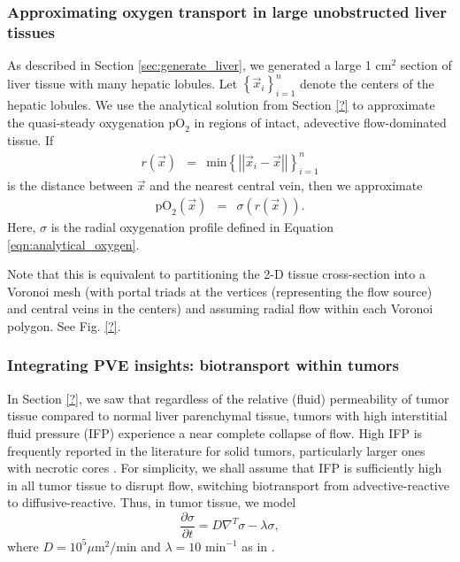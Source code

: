 \documentclass[smallextended,natbib]{svjour3}
\newcommand{\beqa}{\begin{eqnarray}}
\newcommand{\beq}{\begin{equation}}
\newcommand{\eeqa}{\end{eqnarray}}
\newcommand{\eeq}{\end{equation}}
\newcommand{\micron}{\mu\textrm{m}}
\newcommand{\norm}[1]{\left|\left|#1\right|\right|}
\newcommand{\oxy}{\mathrm{pO}_2}
\newcommand{\braces}[1]{\left\{#1\right\}}
\begin{document}
\subsubsection{Approximating oxygen transport in large unobstructed liver tissues}
As described in Section \ref{sec:generate_liver}, we generated a large 1 cm$^2$ 
section of liver tissue with many hepatic lobules. Let 
$\braces{ \vec{x}_i }_{i=1}^n$ denote the centers of the hepatic lobules. 
We use the analytical solution from Section \ref{?} to approximate the 
quasi-steady oxygenation $\oxy$ in regions of intact, 
adevective flow-dominated tissue. If 
\beqa
r(\vec{x}) & = & \mathrm{min}\braces{ \norm{ \vec{x}_i -\vec{x}} }_{i=1}^n 
\eeqa
is the distance between $\vec{x}$ and the nearest central vein, 
then we approximate 
\beqa
\oxy(\vec{x}) & = & \sigma\left( r(\vec{x}) \right). 
\eeqa
Here, $\sigma$ is the radial oxygenation profile 
defined in Equation \ref{eqn:analytical_oxygen}. 

Note that this is equivalent to partitioning the 2-D tissue cross-section 
into a Voronoi mesh (with portal triads at the vertices (representing the 
flow source) and central veins in the centers) and assuming radial flow 
within each Voronoi polygon. See Fig. \ref{?}. 

\subsubsection{Integrating PVE insights: biotransport within tumors}
In Section \ref{?}, we saw that regardless of the relative (fluid) permeability 
of tumor tissue compared to normal liver parenchymal tissue, tumors with 
high interstitial fluid pressure (IFP) experience a near complete collapse of 
flow. High IFP is frequently reported in the literature for solid tumors, particularly larger ones with necrotic cores  
\cite{?}. 
For simplicity, we shall assume that IFP is sufficiently high in all tumor tissue to disrupt flow, switching biotransport from advective-reactive to diffusive-reactive.  Thus, in tumor tissue, we model 
\beq
\frac{\partial \sigma}{\partial t}  =  
D \nabla^T \sigma - \lambda \sigma, 
\eeq
where $D = 10^5 \micron^2/\textrm{min}$ and $\lambda = 10 \textrm{ min}^{-1}$ as 
in \cite{?}. 
\end{document}
